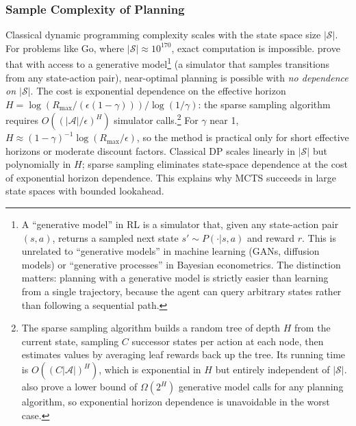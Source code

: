 \subsubsection{Sample Complexity of Planning}

Classical dynamic programming complexity scales with the state space size $|\mathcal{S}|$. For problems like Go, where $|\mathcal{S}| \approx 10^{170}$, exact computation is impossible. \citet{kearns2002} prove that with access to a generative model\footnote{A ``generative model'' in RL is a simulator that, given any state-action pair $(s,a)$, returns a sampled next state $s' \sim P(\cdot|s,a)$ and reward $r$. This is unrelated to ``generative models'' in machine learning (GANs, diffusion models) or ``generative processes'' in Bayesian econometrics. The distinction matters: planning with a generative model is strictly easier than learning from a single trajectory, because the agent can query arbitrary states rather than following a sequential path.} (a simulator that samples transitions from any state-action pair), near-optimal planning is possible with \emph{no dependence on $|\mathcal{S}|$}. The cost is exponential dependence on the effective horizon $H = \log(R_{\max}/(\epsilon(1-\gamma))) / \log(1/\gamma)$: the sparse sampling algorithm requires $O((|\mathcal{A}|/\epsilon)^{H})$ simulator calls.\footnote{The sparse sampling algorithm builds a random tree of depth $H$ from the current state, sampling $C$ successor states per action at each node, then estimates values by averaging leaf rewards back up the tree. Its running time is $O((C|\mathcal{A}|)^H)$, which is exponential in $H$ but entirely independent of $|\mathcal{S}|$. \citet{kearns2002} also prove a lower bound of $\Omega(2^H)$ generative model calls for any planning algorithm, so exponential horizon dependence is unavoidable in the worst case.} For $\gamma$ near 1, $H \approx (1-\gamma)^{-1} \log(R_{\max}/\epsilon)$, so the method is practical only for short effective horizons or moderate discount factors. Classical DP scales linearly in $|\mathcal{S}|$ but polynomially in $H$; sparse sampling eliminates state-space dependence at the cost of exponential horizon dependence. This explains why MCTS succeeds in large state spaces with bounded lookahead.

